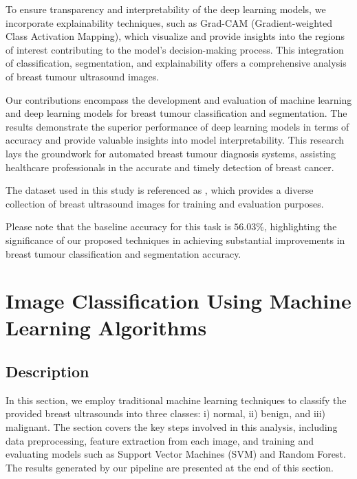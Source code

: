 To ensure transparency and interpretability of the deep learning models, we incorporate explainability techniques, such as Grad-CAM (Gradient-weighted Class Activation Mapping), which visualize and provide insights into the regions of interest contributing to the model's decision-making process. This integration of classification, segmentation, and explainability offers a comprehensive analysis of breast tumour ultrasound images.

Our contributions encompass the development and evaluation of machine learning and deep learning models for breast tumour classification and segmentation. The results demonstrate the superior performance of deep learning models in terms of accuracy and provide valuable insights into model interpretability. This research lays the groundwork for automated breast tumour diagnosis systems, assisting healthcare professionals in the accurate and timely detection of breast cancer.

The dataset used in this study is referenced as \cite{dataset}, which provides a diverse collection of breast ultrasound images for training and evaluation purposes.

Please note that the baseline accuracy for this task is $56.03\%$, highlighting the significance of our proposed techniques in achieving substantial improvements in breast tumour classification and segmentation accuracy.

\section{Image Classification Using Machine Learning Algorithms}

\subsection{Description}
In this section, we employ traditional machine learning techniques to classify the provided breast ultrasounds into three classes: i) normal, ii) benign, and iii) malignant. The section covers the key steps involved in this analysis, including data preprocessing, feature extraction from each image, and training and evaluating models such as Support Vector Machines (SVM) and Random Forest. The results generated by our pipeline are presented at the end of this section.

